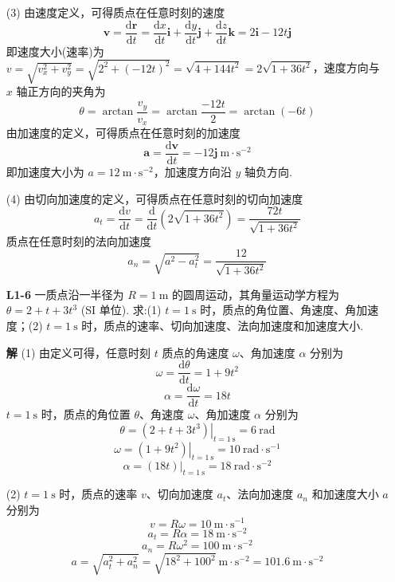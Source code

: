 \begin{enumerate}
	(3) 由速度定义，可得质点在任意时刻的速度
	\[
	\boldsymbol{v} = \frac{\mathrm{d}\boldsymbol{r}}{\mathrm{d}t} = \frac{\mathrm{d}x}{\mathrm{d}t}\boldsymbol{i} + \frac{\mathrm{d}y}{\mathrm{d}t}\boldsymbol{j} + \frac{\mathrm{d}z}{\mathrm{d}t}\boldsymbol{k} = 2\boldsymbol{i} - 12t\boldsymbol{j}
	\]
	即速度大小(速率)为 $v = \sqrt{v_x^2 + v_y^2} = \sqrt{2^2 + (-12t)^2} = \sqrt{4 + 144t^2} = 2\sqrt{1 + 36t^2}$，速度方向与 $x$ 轴正方向的夹角为
	\[
	\theta = \arctan \frac{v_y}{v_x} = \arctan \frac{-12t}{2} = \arctan(-6t)
	\]
	由加速度的定义，可得质点在任意时刻的加速度
	\[
	\boldsymbol{a} = \frac{\mathrm{d}\boldsymbol{v}}{\mathrm{d}t} = -12\boldsymbol{j} \mathrm{\ m \cdot s^{-2}}
	\]
	即加速度大小为 $a = 12 \mathrm{\ m \cdot s^{-2}}$，加速度方向沿 $y$ 轴负方向.
	
	(4) 由切向加速度的定义，可得质点在任意时刻的切向加速度
	\[
	a_t = \frac{\mathrm{d}v}{\mathrm{d}t} = \frac{\mathrm{d}}{\mathrm{d}t}\left( 2\sqrt{1 + 36t^2} \right) = \frac{72t}{\sqrt{1 + 36t^2}}
	\]
	质点在任意时刻的法向加速度
	\[
	a_n = \sqrt{a^2 - a_t^2} = \frac{12}{\sqrt{1 + 36t^2}}
	\]
	
	\vspace{2em}
	
	\item [\textbf{L1-6}]
	\quad 一质点沿一半径为 $R = 1 \mathrm{\ m}$ 的圆周运动，其角量运动学方程为 $\theta = 2 + t + 3t^3$ (SI 单位). 求:(1) $t = 1 \mathrm{\ s}$ 时，质点的角位置、角速度、角加速度；(2) $t = 1 \mathrm{\ s}$ 时，质点的速率、切向加速度、法向加速度和加速度大小.
	
	\textbf{解} \quad (1) 由定义可得，任意时刻 $t$ 质点的角速度 $\omega$、角加速度 $\alpha$ 分别为
	\[
	\omega = \frac{\mathrm{d}\theta}{\mathrm{d}t} = 1 + 9t^2
	\]
	\[
	\alpha = \frac{\mathrm{d}\omega}{\mathrm{d}t} = 18t
	\]
	$t = 1 \mathrm{\ s}$ 时，质点的角位置 $\theta$、角速度 $\omega$、角加速度 $\alpha$ 分别为
	\[
	\theta = \left.(2 + t + 3t^3)\right|_{t=1 \mathrm{\ s}} = 6 \mathrm{\ rad}
	\]
	\[
	\omega = \left.(1 + 9t^2)\right|_{t=1 \mathrm{\ s}} = 10 \mathrm{\ rad \cdot s^{-1}}
	\]
	\[
	\alpha = \left.(18t)\right|_{t=1 \mathrm{\ s}} = 18 \mathrm{\ rad \cdot s^{-2}}
	\]
	
	(2) $t = 1 \mathrm{\ s}$ 时，质点的速率 $v$、切向加速度 $a_t$、法向加速度 $a_n$ 和加速度大小 $a$ 分别为
	\[
	v = R\omega = 10 \mathrm{\ m \cdot s^{-1}}
	\]
	\[
	a_t = R\alpha = 18 \mathrm{\ m \cdot s^{-2}}
	\]
	\[
	a_n = R\omega^2 = 100 \mathrm{\ m \cdot s^{-2}}
	\]
	\[
	a = \sqrt{a_t^2 + a_n^2} = \sqrt{18^2 + 100^2} \mathrm{\ m \cdot s^{-2}} = 101.6 \mathrm{\ m \cdot s^{-2}}
	\]
	

\end{enumerate}
